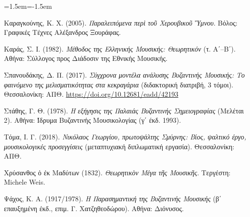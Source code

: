 \documentclass[11pt,a4paper]{article}
\begin{document}
\begin{list}{}{\leftmargin=1.5em\itemindent=-1.5em\itemsep=1pt}
\item Καραγκούνης, Κ. Χ. (2005). \emph{Παραλειπόμενα περὶ τοῦ Χερουβικοῦ Ὕμνου}. Βόλος: Γραφικές Τέχνες Αλέξανδρος Ξουράφας.
\item Καράς, Σ. Ι. (1982). \emph{Μέθοδος της Ελληνικής Μουσικής: Θεωρητικόν} (τ. Α΄--Β΄). Αθήνα: Σύλλογος προς Διάδοσιν της Εθνικής Μουσικής.
\item Σπανουδάκης, Δ. Π. (2017). \emph{Σύγχρονα μοντέλα ανάλυσης Βυζαντινής Μουσικής: Το φαινόμενο της μελισματικότητας στα κεκραγάρια} (διδακτορική διατριβή, 3 τόμοι). Θεσσαλονίκη: ΑΠΘ. \url{https://doi.org/10.12681/eadd/42193}
\item Στάθης, Γ. Θ. (1978). \emph{Η εξήγησις της Παλαιάς Βυζαντινής Σημειογραφίας} (Μελέται 2). Αθήνα: Ίδρυμα Βυζαντινής Μουσικολογίας (γ΄ έκδ. 1993).
\item Τόμα, Ι. Γ. (2018). \emph{Νικόλαος Γεωργίου, πρωτοψάλτης Σμύρνης: Βίος, ψαλτικό έργο, μουσικολογικές προσεγγίσεις} (μεταπτυχιακή διπλωματική εργασία). Θεσσαλονίκη: ΑΠΘ.
\item Χρύσανθος ὁ ἐκ Μαδύτων (1832). \emph{Θεωρητικὸν Μέγα τῆς Μουσικῆς}. Τεργέστη: Michele Weis.
\item Ψάχος, Κ. Α. (1917/1978). \emph{Η Παρασημαντική της Βυζαντινής Μουσικής} (β΄ επαυξημένη έκδ., επιμ. Γ. Χατζηθεοδώρου). Αθήνα: Διόνυσος.
\end{list}
\end{document}
